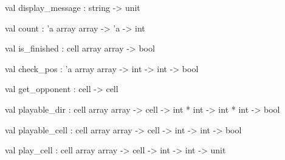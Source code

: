\documentclass[11pt]{article}
\begin{document}
\label{val:Othello.display-underscoremessage}\begin{ocamldoccode}
val display_message : string -> unit
\end{ocamldoccode}




\label{val:Othello.count}\begin{ocamldoccode}
val count : 'a array array -> 'a -> int
\end{ocamldoccode}




\label{val:Othello.is-underscorefinished}\begin{ocamldoccode}
val is_finished : cell array array -> bool
\end{ocamldoccode}




\label{val:Othello.check-underscorepos}\begin{ocamldoccode}
val check_pos : 'a array array -> int -> int -> bool
\end{ocamldoccode}




\label{val:Othello.get-underscoreopponent}\begin{ocamldoccode}
val get_opponent : cell -> cell
\end{ocamldoccode}




\label{val:Othello.playable-underscoredir}\begin{ocamldoccode}
val playable_dir : cell array array -> cell -> int * int -> int * int -> bool
\end{ocamldoccode}




\label{val:Othello.playable-underscorecell}\begin{ocamldoccode}
val playable_cell : cell array array -> cell -> int -> int -> bool
\end{ocamldoccode}




\label{val:Othello.play-underscorecell}\begin{ocamldoccode}
val play_cell : cell array array -> cell -> int -> int -> unit
\end{ocamldoccode}
\end{document}
